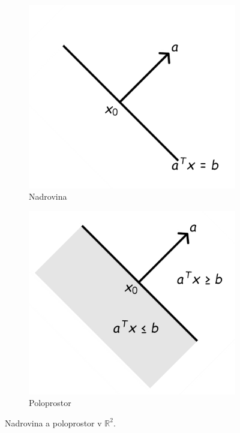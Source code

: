 \begin{figure}[h!]
    \centering
    \begin{subfigure}[b]{0.3\textwidth}
        \centering
        \includegraphics[width=\textwidth]{img/hyperplane.jpg}   
        \caption{Nadrovina}
        \label{fig:hyperplane}
    \end{subfigure}

    \hfill

    \begin{subfigure}[b]{0.3\textwidth}
        \centering
        \includegraphics[width=\textwidth]{img/halfspace.jpg}   
        \caption{Poloprostor}
        \label{fig:halfspace}
    \end{subfigure}

    \caption{Nadrovina a poloprostor v $\mathbb{R}^2$.}
    \label{fig:hyperplane_halfspace}
\end{figure}

